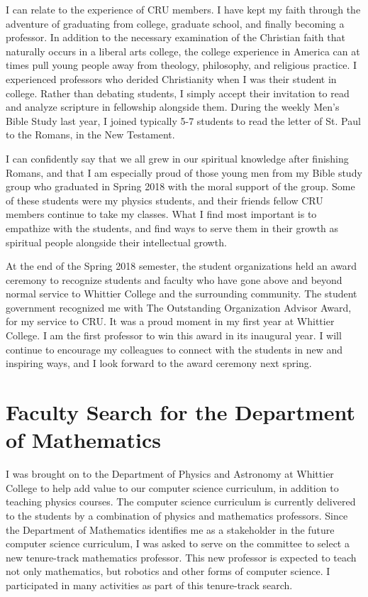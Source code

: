 \documentclass[../main.tex]{subfiles}
\begin{document}
I can relate to the experience of CRU members.  I have kept my faith through the adventure of graduating from college, graduate school, and finally becoming a professor.  In addition to the necessary examination of the Christian faith that naturally occurs in a liberal arts college, the college experience in America can at times pull young people away from theology, philosophy, and religious practice.  I experienced professors who derided Christianity when I was their student in college.  Rather than debating students, I simply accept their invitation to read and analyze scripture in fellowship alongside them.  During the weekly Men's Bible Study last year, I joined typically 5-7 students to read the letter of St. Paul to the Romans, in the New Testament. \\ \hspace{0.1cm}

I can confidently say that we all grew in our spiritual knowledge after finishing Romans, and that I am especially proud of those young men from my Bible study group who graduated in Spring 2018 with the moral support of the group.  Some of these students were my physics students, and their friends fellow CRU members continue to take my classes.  What I find most important is to empathize with the students, and find ways to serve them in their growth as spiritual people alongside their intellectual growth.  \\ \hspace{0.1cm}

At the end of the Spring 2018 semester, the student organizations held an award ceremony to recognize students and faculty who have gone above and beyond normal service to Whittier College and the surrounding community.  The student government recognized me with The Outstanding Organization Advisor Award, for my service to CRU.  It was a proud moment in my first year at Whittier College.  I am the first professor to win this award in its inaugural year.  I will continue to encourage my colleagues to connect with the students in new and inspiring ways, and I look forward to the award ceremony next spring. \\ \hspace{0.1cm}

\section{Faculty Search for the Department of Mathematics}

I was brought on to the Department of Physics and Astronomy at Whittier College to help add value to our computer science curriculum, in addition to teaching physics courses.  The computer science curriculum is currently delivered to the students by a combination of physics and mathematics professors.  Since the Department of Mathematics identifies me as a stakeholder in the future computer science curriculum, I was asked to serve on the committee to select a new tenure-track mathematics professor.  This new professor is expected to teach not only mathematics, but robotics and other forms of computer science.  I participated in many activities as part of this tenure-track search.  \\ \hspace{0.1cm} 
\end{document}
